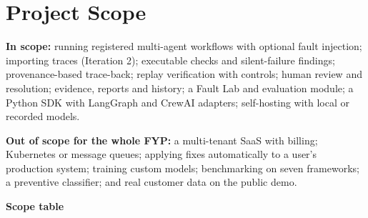 \documentclass{fast-nuces-bs}
\begin{document}
\section{Project Scope}

\textbf{In scope:} running registered multi-agent workflows with optional fault injection; importing traces (Iteration 2); executable checks and silent-failure findings; provenance-based trace-back; replay verification with controls; human review and resolution; evidence, reports and history; a Fault Lab and evaluation module; a Python SDK with LangGraph and CrewAI adapters; self-hosting with local or recorded models.

\textbf{Out of scope for the whole FYP:} a multi-tenant SaaS with billing; Kubernetes or message queues; applying fixes automatically to a user's production system; training custom models; benchmarking on seven frameworks; a preventive classifier; and real customer data on the public demo.

\textbf{Scope table}
\end{document}
